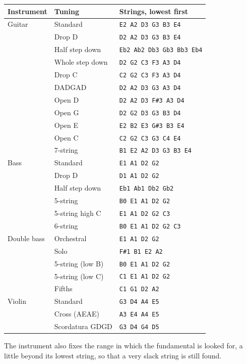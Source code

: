 \documentclass[12pt,
              article,
              oneside
              ]{memoir}
\begin{document}
\begin{longtable}{@{}lll@{}}
\toprule
Instrument & Tuning & Strings, lowest first\\
\midrule
\endhead
Guitar & Standard & \texttt{E2 A2 D3 G3 B3 E4} \\
 & Drop D & \texttt{D2 A2 D3 G3 B3 E4} \\
 & Half step down & \texttt{Eb2 Ab2 Db3 Gb3 Bb3 Eb4} \\
 & Whole step down & \texttt{D2 G2 C3 F3 A3 D4} \\
 & Drop C & \texttt{C2 G2 C3 F3 A3 D4} \\
 & DADGAD & \texttt{D2 A2 D3 G3 A3 D4} \\
 & Open D & \texttt{D2 A2 D3 F\#3 A3 D4} \\
 & Open G & \texttt{D2 G2 D3 G3 B3 D4} \\
 & Open E & \texttt{E2 B2 E3 G\#3 B3 E4} \\
 & Open C & \texttt{C2 G2 C3 G3 C4 E4} \\
 & 7-string & \texttt{B1 E2 A2 D3 G3 B3 E4} \\
\addlinespace
Bass & Standard & \texttt{E1 A1 D2 G2} \\
 & Drop D & \texttt{D1 A1 D2 G2} \\
 & Half step down & \texttt{Eb1 Ab1 Db2 Gb2} \\
 & 5-string & \texttt{B0 E1 A1 D2 G2} \\
 & 5-string high C & \texttt{E1 A1 D2 G2 C3} \\
 & 6-string & \texttt{B0 E1 A1 D2 G2 C3} \\
\addlinespace
Double bass & Orchestral & \texttt{E1 A1 D2 G2} \\
 & Solo & \texttt{F\#1 B1 E2 A2} \\
 & 5-string (low B) & \texttt{B0 E1 A1 D2 G2} \\
 & 5-string (low C) & \texttt{C1 E1 A1 D2 G2} \\
 & Fifths & \texttt{C1 G1 D2 A2} \\
\addlinespace
Violin & Standard & \texttt{G3 D4 A4 E5} \\
 & Cross (AEAE) & \texttt{A3 E4 A4 E5} \\
 & Scordatura GDGD & \texttt{G3 D4 G4 D5} \\
\bottomrule
\end{longtable}

\noindent The instrument also fixes the range in which the fundamental is
looked for, a little beyond its lowest string, so that a very slack string
is still found.
\end{document}
